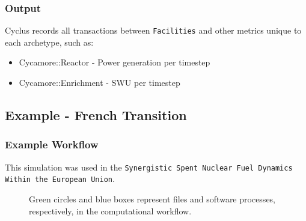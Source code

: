 \begin{frame}
    \frametitle{Output}
    Cyclus records all transactions between \texttt{Facilities}
    and other metrics unique to each archetype, such as:
    \begin{itemize}
        \item Cycamore::Reactor - Power generation per timestep
        \item Cycamore::Enrichment - SWU per timestep
    \end{itemize}
\end{frame}


\subsection{Example - French Transition}
\begin{frame}
    \frametitle{Example Workflow}
    This simulation was used in the \texttt{Synergistic Spent Nuclear Fuel Dynamics Within the European Union}.

\begin{figure}
\caption{Green circles and blue boxes represent files and software 
processes, respectively, in the computational workflow.}
\label{diag:comp}
\end{figure}

\end{frame}

